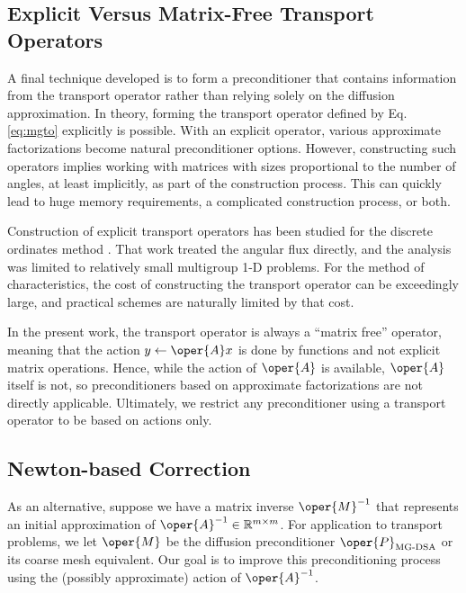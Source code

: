 \subsection{Explicit Versus Matrix-Free Transport Operators}

A final technique developed is to form a preconditioner that contains
information from the transport operator rather than relying solely on 
the diffusion approximation.   In theory, forming the transport operator 
defined by Eq. \ref{eq:mgto} explicitly is possible.
With an explicit operator, various 
approximate factorizations become natural preconditioner options. 
However, constructing such operators implies working with matrices with 
sizes proportional to the  number of angles, at least implicitly, as part 
of the construction process. This can quickly lead to huge memory 
requirements, a complicated  construction process, or both.  

Construction of explicit transport operators has been studied for
the discrete ordinates method \cite{patton2002apg}. That work treated the
angular flux directly, and the analysis was limited to relatively small
multigroup 1-D problems. For the method of characteristics, the cost of
constructing the transport operator can be exceedingly large, and practical
schemes are naturally limited by that cost.

In the present work, the transport operator is always a 
``matrix free'' operator,  meaning that the action $y \gets \oper{A}x$
is done by functions and not explicit matrix operations.  Hence, while 
the action of $\oper{A}$ is available, $\oper{A}$ itself is not,  
so preconditioners based on approximate factorizations are not directly 
applicable.  Ultimately, we restrict any preconditioner using a 
transport operator to be based on actions only.

\subsection{Newton-based Correction}
\label{sec:newtonsmethod}

As an alternative, suppose we have a matrix inverse 
$\oper{M}^{-1}$ that represents an initial approximation of 
$\oper{A}^{-1}  \in \mathbb{R}^{m\times m}$.  For application to 
transport problems, we let $\oper{M}$ be the diffusion 
preconditioner $\oper{P}_{\text{MG-DSA}}$ or its coarse mesh equivalent.
Our goal is to improve this preconditioning process using the 
(possibly approximate) action of $\oper{A}^{-1}$.

